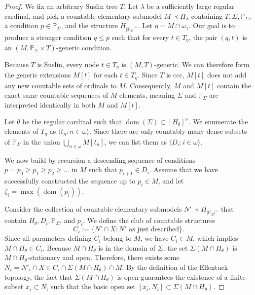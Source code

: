 \documentclass[a4paper,11pt]{article}
\newcommand{\forceP}{\mathbb{P}}
\begin{document}
\begin{proof}
We fix an arbitrary Suslin tree $T$. Let $\lambda$ be a sufficiently large regular cardinal, and pick a countable elementary submodel $M \prec H_{\lambda}$ containing $T, \Sigma, \forceP_{\Sigma}$, a condition $p \in \forceP_{\Sigma}$, and the structure $H_{|\forceP_{\Sigma}|^+}$. Let $\eta = M \cap \omega_1$. Our goal is to produce a stronger condition $q \le p$ such that for every $t \in T_{\eta}$, the pair $(q,t)$ is an $(M, \forceP_{\Sigma} \times T)$-generic condition. 

Because $T$ is Suslin, every node $t \in T_{\eta}$ is $(M,T)$-generic. We can therefore form the generic extensions $M[t]$ for each $t \in T_{\eta}$. Since $T$ is ccc, $M[t]$ does not add any new countable sets of ordinals to $M$. Consequently, $M$ and $M[t]$ contain the exact same countable sequences of $M$-elements, meaning $\Sigma$ and $\forceP_{\Sigma}$ are interpreted identically in both $M$ and $M[t]$. 

Let $\theta$ be the regular cardinal such that $\operatorname{dom}(\Sigma) \subset [H_{\theta}]^{\omega}$. We enumerate the elements of $T_{\eta}$ as $\langle t_n : n \in \omega \rangle$. Since there are only countably many dense subsets of $\forceP_{\Sigma}$ in the union $\bigcup_{n \in \omega} M[t_n]$, we can list them as $\langle D_i : i \in \omega \rangle$. 

We now build by recursion a descending sequence of conditions $p = p_0 \ge p_1 \ge p_2 \ge \dots$ in $M$ such that $p_{i+1} \in D_i$. Assume that we have successfully constructed the sequence up to $p_i \in M$, and let $\zeta_i = \max(\operatorname{dom}(p_i))$. 

Consider the collection of countable elementary submodels $N' \prec H_{|\forceP_{\Sigma}|^+}$ that contain $H_{\theta}, D_i, \forceP_{\Sigma}$, and $p_i$. We define the club of countable structures 
$$C_i := \{ N' \cap X : N' \text{ as just described} \}.$$ 
Since all parameters defining $C_i$ belong to $M$, we have $C_i \in M$, which implies $M \cap H_{\theta} \in C_i$. Because $M \cap H_{\theta}$ is in the domain of $\Sigma$, the set $\Sigma(M \cap H_{\theta})$ is $M \cap H_{\theta}$-stationary and open. Therefore, there exists some $N_i = N'_i \cap X \in C_i \cap \Sigma(M \cap H_{\theta}) \cap M$. By the definition of the Ellentuck topology, the fact that $\Sigma(M \cap H_{\theta})$ is open guarantees the existence of a finite subset $x_i \subset N_i$ such that the basic open set $[x_i, N_i] \subset \Sigma(M \cap H_{\theta})$.


\end{proof}
\end{document}
